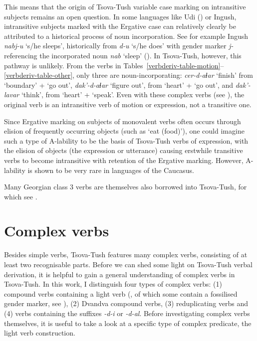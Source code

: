 This means that the origin of Tsova-Tush variable case marking on intransitive subjects remains an open question. In some languages like Udi (\cites[]{harris10unacc}) or Ingush, intransitive subjects marked with the Ergative case can relatively clearly be attributed to a historical process of noun incorporation. See for example Ingush \textit{nabj-u} `s/he sleeps', historically from \textit{d-u} `s/he does' with gender marker \textit{j-} referencing the incorporated noun \textit{nab} `sleep' (\cites{nichols08ingushcase,forker17ergativity}). In Tsova-Tush, however, this pathway is unlikely. From the verbs in Tables~\ref{verbderiv-table-motion}--\ref{verbderiv-table-other}, only three are noun-incorporating: \textit{cer-d-aɬar} `finish' from `boundary' + `go out', \textit{dak'-d-aɬar} `figure out', from `heart' + `go out', and \textit{dak'-lavar} `think', from `heart' + `speak'. Even with these complex verbs (see ), the original verb is an intransitive verb of motion or expression, not a transitive one.

Since Ergative marking on subjects of monovalent verbs often occurs through elision of frequently occurring objects (such as `eat (food)'), one could imagine such a type of A-lability to be the basis of Tsova-Tush verbs of expression, with the elision of objects (the expression or utterance) causing erstwhile transitive verbs to become intransitive with retention of the Ergative marking. However, A-lability is shown to be very rare in languages of the Caucasus. 



Many Georgian class 3 verbs are themselves also borrowed into Tsova-Tush, for which see .

\section{Complex verbs} \label{lightverbs}

Besides simple verbs, Tsova-Tush features many complex verbs, consisting of at least two recognisable parts.
Before we can shed some light on Tsova-Tush verbal derivation, it is helpful to gain a general understanding of complex verbs in Tsova-Tush. In this work, I distinguish four types of complex verbs: (1) compound verbs containing a light verb (, of which some contain a fossilised gender marker, see ), (2) Dvandva compound verbs, (3) reduplicating verbs and (4) verbs containing the suffixes \textit{-d-i} or \textit{-d-al}. Before investigating complex verbs themselves, it is useful to take a look at a specific type of complex predicate, the light verb construction.


